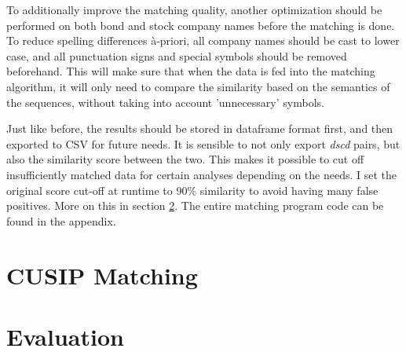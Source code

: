 To additionally improve the matching quality, another optimization should be performed on both bond and stock company names before the matching is done. To reduce spelling differences \`{a}-priori, all company names should be cast to lower case, and all punctuation signs and special symbols should be removed beforehand. This will make sure that when the data is fed into the matching algorithm, it will only need to compare the similarity based on the semantics of the sequences, without taking into account 'unnecessary' symbols. 

Just like before, the results should be stored in dataframe format first, and then exported to CSV for future needs. It is sensible to not only export \textit{dscd} pairs, but also the similarity score between the two. This makes it possible to cut off insufficiently matched data for certain analyses depending on the needs. I set the original score cut-off at runtime to 90\% similarity to avoid having many false positives. More on this in section \ref{section:matching-evaluation}. The entire matching program code can be found in the appendix. %

\section{CUSIP Matching} \label{section:cusip-matching}


\section{Evaluation} \label{section:matching-evaluation}



